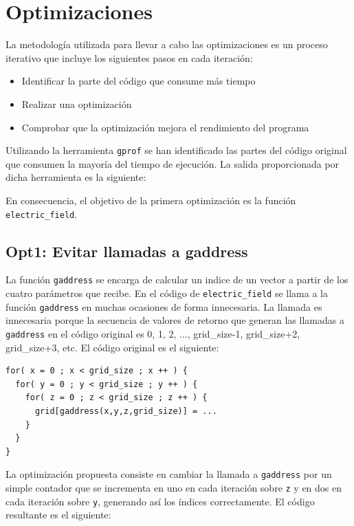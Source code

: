 \section{Optimizaciones}

La metodolog\'{i}a utilizada para llevar a cabo las optimizaciones es un
proceso iterativo que incluye los siguientes pasos en cada iteraci\'{o}n:

\begin{itemize}
\item Identificar la parte del c\'{o}digo que consume m\'{a}s tiempo
\item Realizar una optimizaci\'{o}n
\item Comprobar que la optimizaci\'{o}n mejora el rendimiento del programa
\end{itemize}

Utilizando la herramienta \texttt{gprof} se han identificado las partes del
c\'{o}digo original que consumen la mayor\'{i}a del tiempo de ejecuci\'{o}n.
La salida proporcionada por dicha herramienta es la siguiente:


En consecuencia, el objetivo de la primera optimizaci\'{o}n es la funci\'{o}n
\texttt{electric\_field}.

\subsection{Opt1: Evitar llamadas a gaddress}

La funci\'{o}n \texttt{gaddress} se encarga de calcular un indice de un
vector a partir de los cuatro par\'{a}metros que recibe. En el c\'{o}digo de
\texttt{electric\_field} se llama a la funci\'{o}n \texttt{gaddress} en
muchas ocasiones de forma innecesaria. La llamada es innecesaria porque la
secuencia de valores de retorno que generan las llamadas a \texttt{gaddress}
en el c\'{o}digo original es 0, 1, 2, ..., grid\_size-1, grid\_size+2,
grid\_size+3, etc. El c\'{o}digo original es el siguiente:

\begin{lstlisting}[]
for( x = 0 ; x < grid_size ; x ++ ) {
  for( y = 0 ; y < grid_size ; y ++ ) {
    for( z = 0 ; z < grid_size ; z ++ ) {
      grid[gaddress(x,y,z,grid_size)] = ...
    }
  }
}
\end{lstlisting}

La optimizaci\'{o}n propuesta consiste en cambiar la llamada a
\texttt{gaddress} por un simple contador que se incrementa en uno en cada
iteraci\'{o}n sobre \texttt{z} y en dos en cada iteraci\'{o}n sobre
\texttt{y}, generando as\'{i} los \'{i}ndices correctamente. El c\'{o}digo
resultante es el siguiente:


